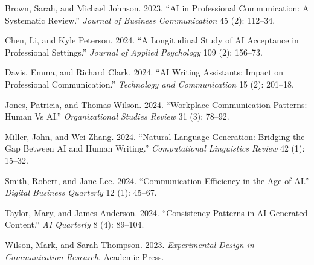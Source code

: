 \documentclass[
  letterpaper,
  DIV=11,
  numbers=noendperiod]{scrartcl}
\newlength{\cslhangindent}
\newenvironment{CSLReferences}[2] %
 {\begin{list}{}{%
  \setlength{\itemindent}{0pt}
  \setlength{\leftmargin}{0pt}
  \setlength{\parsep}{0pt}
  \ifodd #1
   \setlength{\leftmargin}{\cslhangindent}
   \setlength{\itemindent}{-1\cslhangindent}
  \fi
  \setlength{\itemsep}{#2\baselineskip}}}
 {\end{list}}
\begin{document}
\label{refs}
\begin{CSLReferences}{1}{0}
Brown, Sarah, and Michael Johnson. 2023. {``AI in Professional
Communication: A Systematic Review.''} \emph{Journal of Business
Communication} 45 (2): 112--34.

Chen, Li, and Kyle Peterson. 2024. {``A Longitudinal Study of AI
Acceptance in Professional Settings.''} \emph{Journal of Applied
Psychology} 109 (2): 156--73.

Davis, Emma, and Richard Clark. 2024. {``AI Writing Assistants: Impact
on Professional Communication.''} \emph{Technology and Communication} 15
(2): 201--18.

Jones, Patricia, and Thomas Wilson. 2024. {``Workplace Communication
Patterns: Human Vs AI.''} \emph{Organizational Studies Review} 31 (3):
78--92.

Miller, John, and Wei Zhang. 2024. {``Natural Language Generation:
Bridging the Gap Between AI and Human Writing.''} \emph{Computational
Linguistics Review} 42 (1): 15--32.

Smith, Robert, and Jane Lee. 2024. {``Communication Efficiency in the
Age of AI.''} \emph{Digital Business Quarterly} 12 (1): 45--67.

Taylor, Mary, and James Anderson. 2024. {``Consistency Patterns in
AI-Generated Content.''} \emph{AI Quarterly} 8 (4): 89--104.

Wilson, Mark, and Sarah Thompson. 2023. \emph{Experimental Design in
Communication Research}. Academic Press.

\end{CSLReferences}
\end{document}
